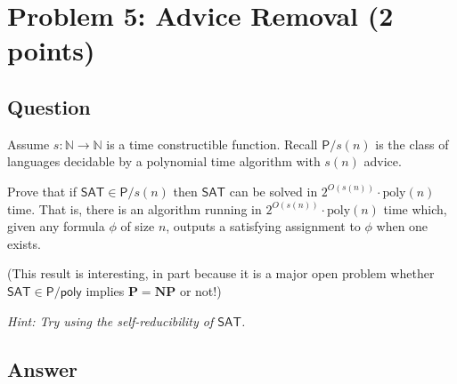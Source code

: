 \documentclass{article}
\renewcommand{\P}{\mathbf{P}}
\newcommand{\NP}{\mathbf{NP}}
\def \N {{\mathbb N}}
\def \poly{\text{poly}}
\begin{document}






















\newpage
\section*{Problem 5: Advice Removal (2 points)}

\subsection*{Question}
Assume $s : \N \rightarrow \N$ is a time constructible function. Recall $\mathsf{P}/s(n)$ is the class of languages decidable by a polynomial time algorithm with $s(n)$ advice. 

Prove that if $\textsf{SAT} \in \mathsf{P}/s(n)$ then $\textsf{SAT}$ can be solved in $2^{O(s(n))}\cdot \poly(n)$ time. That is, there is an algorithm running in $2^{O(s(n))}\cdot \poly(n)$ time which, given any formula $\phi$ of size $n$, outputs a satisfying assignment to $\phi$ when one exists.

(This result is interesting, in part because it is a major open problem whether $\textsf{SAT} \in \mathsf{P}/\mathsf{poly}$ implies $\P = \NP$ or not!)

\emph{Hint: Try using the self-reducibility of $\mathsf{SAT}$.}

\subsection*{Answer}
\end{document}
